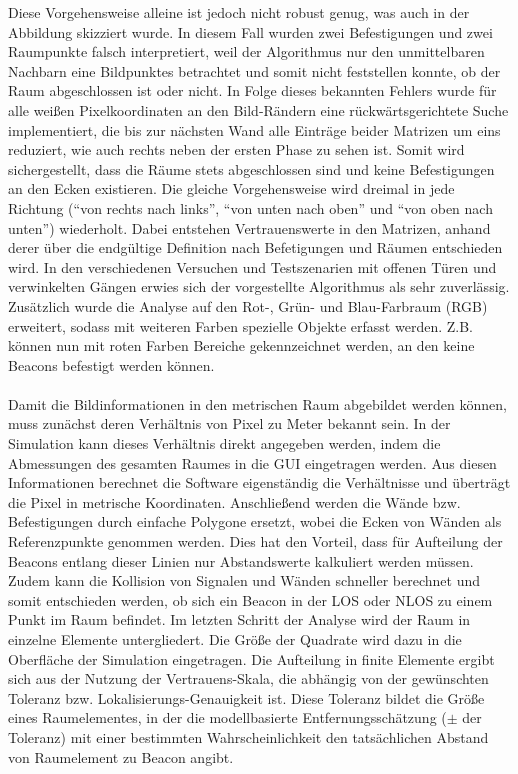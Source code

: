Diese Vorgehensweise alleine ist jedoch nicht robust genug, was auch in der Abbildung skizziert wurde. In diesem Fall wurden zwei Befestigungen und zwei Raumpunkte falsch interpretiert, weil der Algorithmus nur den unmittelbaren Nachbarn eine Bildpunktes betrachtet und somit nicht feststellen konnte, ob der Raum abgeschlossen ist oder nicht. In Folge dieses bekannten Fehlers wurde für alle weißen Pixelkoordinaten an den Bild-Rändern eine rückwärtsgerichtete Suche implementiert, die bis zur nächsten Wand alle Einträge beider Matrizen um eins reduziert, wie auch rechts neben der ersten Phase zu sehen ist. Somit wird sichergestellt, dass die Räume stets abgeschlossen sind und keine Befestigungen an den Ecken existieren. Die gleiche Vorgehensweise wird dreimal in jede Richtung ("`von rechts nach links"', "`von unten nach oben"' und "`von oben nach unten"') wiederholt. Dabei entstehen Vertrauenswerte in den Matrizen, anhand derer über die endgültige Definition nach Befetigungen und Räumen entschieden wird. In den verschiedenen Versuchen und Testszenarien mit offenen Türen und verwinkelten Gängen erwies sich der vorgestellte Algorithmus als sehr zuverlässig. Zusätzlich wurde die Analyse auf den Rot-, Grün- und Blau-Farbraum (RGB) erweitert, sodass mit weiteren Farben spezielle Objekte erfasst werden. Z.B. können nun mit roten Farben Bereiche gekennzeichnet werden, an den keine Beacons befestigt werden können. \\ \\
Damit die Bildinformationen in den metrischen Raum abgebildet werden können, muss zunächst deren Verhältnis von Pixel zu Meter bekannt sein. In der Simulation kann dieses Verhältnis direkt angegeben werden, indem die Abmessungen des gesamten Raumes in die GUI eingetragen werden. Aus diesen Informationen berechnet die Software eigenständig die Verhältnisse und überträgt die Pixel in metrische Koordinaten. Anschließend werden die Wände bzw. Befestigungen durch einfache Polygone ersetzt, wobei die Ecken von Wänden als Referenzpunkte genommen werden. Dies hat den Vorteil, dass für Aufteilung der Beacons entlang dieser Linien nur Abstandswerte kalkuliert werden müssen. Zudem kann die Kollision von Signalen und Wänden schneller berechnet und somit entschieden werden, ob sich ein Beacon in der LOS oder NLOS zu einem Punkt im Raum befindet. Im letzten Schritt der Analyse wird der Raum in einzelne Elemente untergliedert. Die Größe der Quadrate wird dazu in die Oberfläche der Simulation eingetragen. Die Aufteilung in finite Elemente ergibt sich aus der Nutzung der Vertrauens-Skala, die abhängig von der gewünschten Toleranz bzw. Lokalisierungs-Genauigkeit ist. Diese Toleranz bildet die Größe eines Raumelementes, in der die modellbasierte Entfernungsschätzung ($\pm$ der Toleranz) mit einer bestimmten Wahrscheinlichkeit den tatsächlichen Abstand von Raumelement zu Beacon angibt. \\ \\


